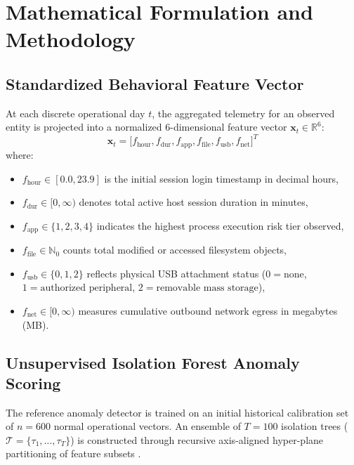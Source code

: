 \documentclass[conference]{IEEEtran}
\begin{document}
\section{Mathematical Formulation and Methodology}

\subsection{Standardized Behavioral Feature Vector}
At each discrete operational day $t$, the aggregated telemetry for an observed entity is projected into a normalized 6-dimensional feature vector $\mathbf{x}_t \in \mathbb{R}^6$:
\begin{equation}
\mathbf{x}_t = \big[ f_{\text{hour}}, f_{\text{dur}}, f_{\text{app}}, f_{\text{file}}, f_{\text{usb}}, f_{\text{net}} \big]^T
\label{eq:feature_vec}
\end{equation}
where:
\begin{itemize}
    \item $f_{\text{hour}} \in [0.0, 23.9]$ is the initial session login timestamp in decimal hours,
    \item $f_{\text{dur}} \in [0, \infty)$ denotes total active host session duration in minutes,
    \item $f_{\text{app}} \in \{1, 2, 3, 4\}$ indicates the highest process execution risk tier observed,
    \item $f_{\text{file}} \in \mathbb{N}_0$ counts total modified or accessed filesystem objects,
    \item $f_{\text{usb}} \in \{0, 1, 2\}$ reflects physical USB attachment status ($0 = \text{none}$, $1 = \text{authorized peripheral}$, $2 = \text{removable mass storage}$),
    \item $f_{\text{net}} \in [0, \infty)$ measures cumulative outbound network egress in megabytes (MB).
\end{itemize}

\subsection{Unsupervised Isolation Forest Anomaly Scoring}
The reference anomaly detector is trained on an initial historical calibration set of $n = 600$ normal operational vectors. An ensemble of $T = 100$ isolation trees ($\mathcal{T} = \{\tau_1, \dots, \tau_T\}$) is constructed through recursive axis-aligned hyper-plane partitioning of feature subsets \cite{b4}. 
\end{document}
